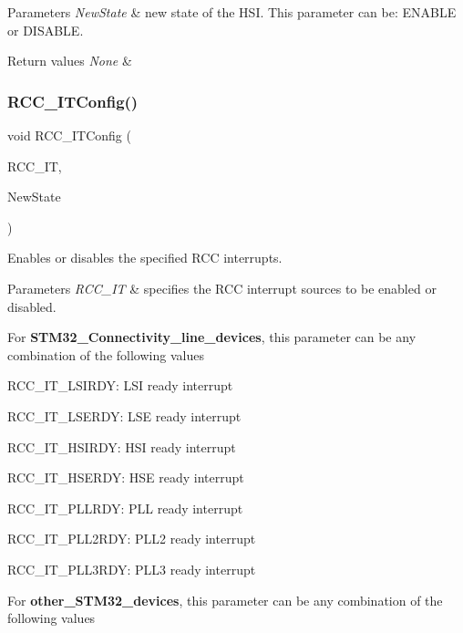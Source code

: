 \begin{DoxyParams}{Parameters}
{\em New\+State} & new state of the H\+SI. This parameter can be\+: E\+N\+A\+B\+LE or D\+I\+S\+A\+B\+LE. \\
\hline
\end{DoxyParams}

\begin{DoxyRetVals}{Return values}
{\em None} & \\
\hline
\end{DoxyRetVals}
\mbox{\label{group___r_c_c___exported___functions_gaa953aa226e9ce45300d535941e4dfe2f}} 
\subsubsection{\texorpdfstring{RCC\_ITConfig()}{RCC\_ITConfig()}}
{\footnotesize\ttfamily void R\+C\+C\+\_\+\+I\+T\+Config (\begin{DoxyParamCaption}\item[{uint8\+\_\+t}]{R\+C\+C\+\_\+\+IT,  }\item[{\mbox{\hyperlink{group___exported__types_gac9a7e9a35d2513ec15c3b537aaa4fba1}{Functional\+State}}}]{New\+State }\end{DoxyParamCaption})}



Enables or disables the specified R\+CC interrupts. 


\begin{DoxyParams}{Parameters}
{\em R\+C\+C\+\_\+\+IT} & specifies the R\+CC interrupt sources to be enabled or disabled.\\
\hline
\end{DoxyParams}
For {\bfseries{S\+T\+M32\+\_\+\+Connectivity\+\_\+line\+\_\+devices}}, this parameter can be any combination of the following values

\begin{DoxyItemize}
\item R\+C\+C\+\_\+\+I\+T\+\_\+\+L\+S\+I\+R\+DY\+: L\+SI ready interrupt \item R\+C\+C\+\_\+\+I\+T\+\_\+\+L\+S\+E\+R\+DY\+: L\+SE ready interrupt \item R\+C\+C\+\_\+\+I\+T\+\_\+\+H\+S\+I\+R\+DY\+: H\+SI ready interrupt \item R\+C\+C\+\_\+\+I\+T\+\_\+\+H\+S\+E\+R\+DY\+: H\+SE ready interrupt \item R\+C\+C\+\_\+\+I\+T\+\_\+\+P\+L\+L\+R\+DY\+: P\+LL ready interrupt \item R\+C\+C\+\_\+\+I\+T\+\_\+\+P\+L\+L2\+R\+DY\+: P\+L\+L2 ready interrupt \item R\+C\+C\+\_\+\+I\+T\+\_\+\+P\+L\+L3\+R\+DY\+: P\+L\+L3 ready interrupt\end{DoxyItemize}
For {\bfseries{other\+\_\+\+S\+T\+M32\+\_\+devices}}, this parameter can be any combination of the following values

